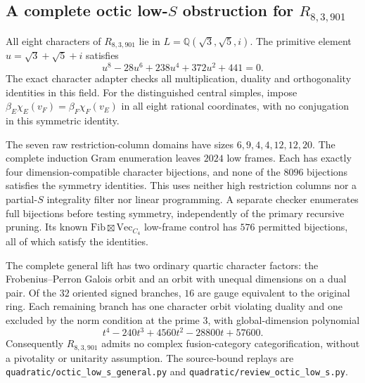 \subsection{A complete octic low-$S$ obstruction for $R_{8,3,901}$}
\label{sec:rank8-octic-low-S}
All eight characters of $R_{8,3,901}$ lie in
$L=\mathbb Q(\sqrt3,\sqrt5,i)$. The primitive element
$u=\sqrt3+\sqrt5+i$ satisfies
\[
 u^8-28u^6+238u^4+372u^2+441=0.
\]
The exact character adapter checks all multiplication, duality and
orthogonality identities in this field. For the distinguished central
simples, impose
$\beta_E\chi_E(v_F)=\beta_F\chi_F(v_E)$ in all eight rational coordinates,
with no conjugation in this symmetric identity.

The seven raw restriction-column domains have sizes
$6,9,4,4,12,12,20$. The complete induction Gram enumeration leaves
$2024$ low frames. Each has exactly four dimension-compatible character
bijections, and none of the $8096$ bijections satisfies the symmetry
identities. This uses neither high restriction columns nor a
partial-$S$ integrality filter nor linear programming. A separate
checker enumerates full bijections before testing symmetry, independently
of the primary recursive pruning. Its known
$\mathrm{Fib}\boxtimes\mathrm{Vec}_{C_4}$ low-frame control has $576$
permitted bijections, all of which satisfy the identities.

The complete general lift has two ordinary quartic character factors:
the Frobenius--Perron Galois orbit and an orbit with unequal dimensions
on a dual pair. Of the $32$ oriented signed branches, $16$ are gauge
equivalent to the original ring. Each remaining branch has one character
orbit violating duality and one excluded by the norm condition at the
prime $3$, with global-dimension polynomial
\[
 t^4-240t^3+4560t^2-28800t+57600.
\]
Consequently $R_{8,3,901}$ admits no complex fusion-category
categorification, without a pivotality or unitarity assumption.
The source-bound replays are
\texttt{quadratic/octic\_low\_s\_general.py} and
\texttt{quadratic/review\_octic\_low\_s.py}.
